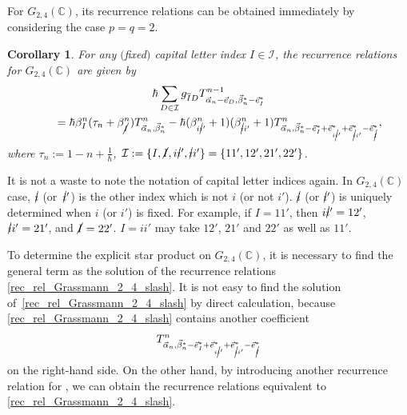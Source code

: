 \documentclass[10pt,a4paper]{amsart}
\numberwithin{equation}{section}
\newtheorem{Corollary}[Theorem]{Corollary}
\begin{document}
For $G_{2,4}(\mathbb{C})$, its recurrence relations can be obtained immediately by considering the case $p=q=2$.
\begin{Corollary}\label{theorem_rec_rel_Grassmann_2_4}
For any $($fixed$)$ capital letter index $I\in\mathcal{I}$, the recurrence relations for
$
 G_{2,4}(\mathbb{C})
$
are given by
\begin{gather}
 \hbar
 \sum_{
 D
 \in
 \mathcal{I}
 }
 g_{\overline{I}D}
 T^{n-1}_{\vec{\alpha}_{n}-\vec{e}_{D},\vec{\beta}_{n}^{\ast}-\vec{e}_{I}^{\ast}}\nonumber\\
 \qquad
 =
 \hbar
 \beta_{I}^{n}
 (
 \tau_{n}
 +
 \beta_{\cancel{I}}^{n}
 )
 T^{n}_{\vec{\alpha}_{n},\vec{\beta}_{n}^{\ast}}
 -
 \hbar
 (
 \beta_{i\cancel{i}'}^{n}
 +
 1
 )
 (
 \beta_{\cancel{i}i'}^{n}
 +
 1
 )
 T^{n}_{\vec{\alpha}_{n},\vec{\beta}_{n}^{\ast}-\vec{e}_{I}^{\ast}+\vec{e}_{i\cancel{i}'}^{\ast}+\vec{e}_{\cancel{i}i'}^{\ast} -\vec{e}_{\cancel{I}}^{\ast}},
 \label{rec_rel_Grassmann_2_4_slash}
\end{gather}
where
$
 \tau_{n}
 :=
 1
 -
 n
 +
 \frac{1}{\hbar}
$,
$
\mathcal{I}
:=
\{
I,
\cancel{I},
i\cancel{i}',
\cancel{i}i'
\}
=
\{
11',
12',
21',
22'
\}
$.
\end{Corollary}

It is not a waste to note the notation of capital letter indices again. In $G_{2,4}(\mathbb{C})$ case, $\cancel{i}$ (or~$\cancel{i}'$) is the other index which is not $i$ (or not $i'$). $\cancel{i}$ (or $\cancel{i}'$) is uniquely determined when $i$ (or $i'$) is fixed. For example, if $I=11'$, then $i\cancel{i}'=12'$, $\cancel{i}i'=21'$, and $\cancel{I}=22'$. $I=ii'$ may take $12'$, $21'$ and $22'$ as well as $11'$.

To determine the explicit star product on $G_{2,4}(\mathbb{C})$, it is necessary to find the general term  as the solution of the recurrence relations \eqref{rec_rel_Grassmann_2_4_slash}. It is not easy to find the solution  of~\eqref{rec_rel_Grassmann_2_4_slash} by direct calculation, because \eqref{rec_rel_Grassmann_2_4_slash} contains another coefficient
\[
T^{n}_{\vec{\alpha}_{n},\vec{\beta}_{n}^{\ast}-\vec{e}_{I}^{\ast}
+\vec{e}_{i\cancel{i}'}^{\ast}+\vec{e}_{\cancel{i}i'}^{\ast}-\vec{e}_{\cancel{I}}^{\ast}}
\]
 on the right-hand side. On the other hand, by introducing another recurrence relation for , we can obtain the recurrence relations equivalent to \eqref{rec_rel_Grassmann_2_4_slash}.
\end{document}
